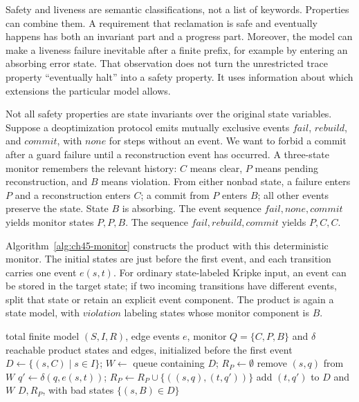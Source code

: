 Safety and liveness are semantic classifications, not a list of keywords.
Properties can combine them.
A requirement that reclamation is safe and eventually happens has both an invariant part and a progress part.
Moreover, the model can make a liveness failure inevitable after a finite prefix, for example by entering an absorbing error state.
That observation does not turn the unrestricted trace property \enquote{eventually halt} into a safety property.
It uses information about which extensions the particular model allows.

Not all safety properties are state invariants over the original state variables.
Suppose a deoptimization protocol emits mutually exclusive events $\mathit{fail}$, $\mathit{rebuild}$, and $\mathit{commit}$, with $\mathit{none}$ for steps without an event.
We want to forbid a commit after a guard failure until a reconstruction event has occurred.
A three-state monitor remembers the relevant history: $C$ means clear, $P$ means pending reconstruction, and $B$ means violation.
From either nonbad state, a failure enters $P$ and a reconstruction enters $C$; a commit from $P$ enters $B$; all other events preserve the state.
State $B$ is absorbing.
The event sequence $\mathit{fail},\mathit{none},\mathit{commit}$ yields monitor states $P,P,B$.
The sequence $\mathit{fail},\mathit{rebuild},\mathit{commit}$ yields $P,C,C$.

Algorithm~\ref{alg:ch45-monitor} constructs the product with this deterministic monitor.
The initial states are just before the first event, and each transition carries one event $e(s,t)$.
For ordinary state-labeled Kripke input, an event can be stored in the target state; if two incoming transitions have different events, split that state or retain an explicit event component.
The product is again a state model, with $\mathit{violation}$ labeling states whose monitor component is $B$.

\begin{algorithm}[tbp]
\caption{Turn a finite-history deoptimization obligation into reachability.}
\label{alg:ch45-monitor}
\begin{pseudocode}
\Require total finite model $(S,I,R)$, edge events $e$, monitor $Q=\{C,P,B\}$ and $\delta$
\Ensure reachable product states and edges, initialized before the first event
\State $D\gets\{(s,C)\mid s\in I\}$; $W\gets$ queue containing $D$; $R_P\gets\emptyset$
  \State remove $(s,q)$ from $W$
    \State $q'\gets\delta(q,e(s,t))$; $R_P\gets R_P\cup\{((s,q),(t,q'))\}$
      \State add $(t,q')$ to $D$ and $W$
    \EndIf
  \EndFor
\EndWhile
\State \Return $D,R_P$, with bad states $\{(s,B)\in D\}$
\end{pseudocode}
\end{algorithm}

